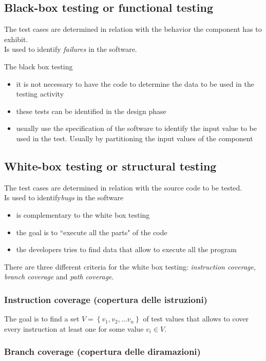 \documentclass{article}
\begin{document}
\subsection{Black-box testing or functional testing}
The test cases are determined in relation with the behavior the component has to exhibit.\\
Is used to identify \emph{failures} in the software.

The black box testing
\begin{itemize}
\item it is not necessary to have the code to determine the data to be used in the testing activity
\item these tests can be identified in the design phase
\item usually use the specification of the software to identify the input value to be used in the test. Usually by partitioning the input values of the component 
\end{itemize}

\subsection{White-box testing or structural testing}
The test cases are determined in relation with the source code to be tested.\\
Is used to identify\emph{bugs} in the software

\begin{itemize}
\item is complementary to the white box testing
\item the goal is to ``execute all the parts" of the code
\item the developers tries to find data that allow to execute all the program
\end{itemize}

There are three different criteria for the white box testing: \emph{instruction coverage}, \emph{branch coverage} and \emph{path coverage}.

\subsubsection{Instruction coverage (copertura delle istruzioni)}
The goal is to find a set $V=\left \{ v_1, v_2, \ldots v_n\right \}$ of test values that allows to cover every instruction at least one for some value $v_i \in V$. 
\subsubsection{Branch coverage (copertura delle diramazioni)}
\end{document}
